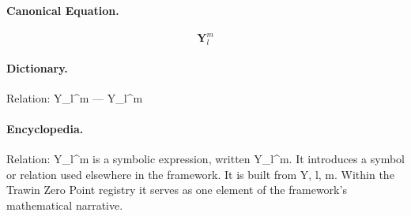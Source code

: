 \paragraph{Canonical Equation.}
\[
\mathbf{Y}_l^m
\]

\paragraph{Dictionary.}
Relation: Y\_l\textasciicircum{}m — Y\_l\textasciicircum{}m

\paragraph{Encyclopedia.}
Relation: Y\_l\textasciicircum{}m is a symbolic expression, written Y\_l\textasciicircum{}m. It introduces a symbol or relation used elsewhere in the framework. It is built from Y, l, m. Within the Trawin Zero Point registry it serves as one element of the framework's mathematical narrative.
